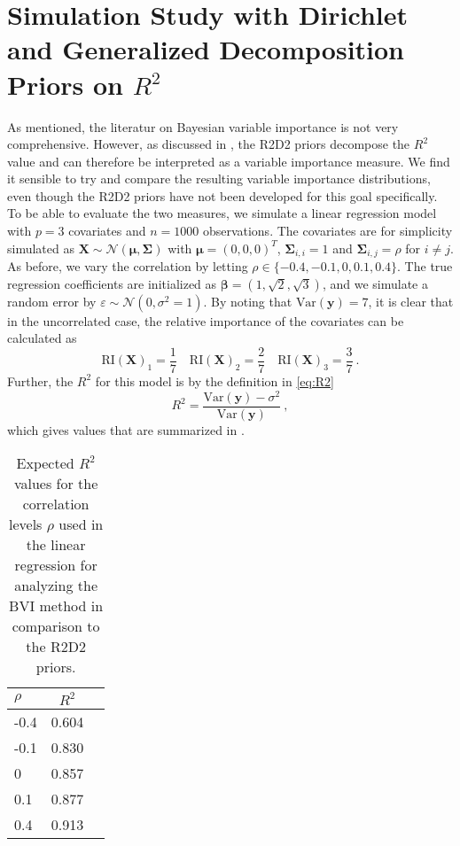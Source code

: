 \section{Simulation Study with Dirichlet and Generalized Decomposition Priors on \texorpdfstring{$R^2$}{Lg}}
\label{sec:r2d2method}
As mentioned, the literatur on Bayesian variable importance is not very comprehensive. However, as discussed in , the R2D2 priors decompose the $R^2$ value and can therefore be interpreted as a variable importance measure. We find it sensible to try and compare the resulting variable importance distributions, even though the R2D2 priors have not been developed for this goal specifically. To be able to evaluate the two measures, we simulate a linear regression model with $p=3$ covariates and $n=1000$ observations. The covariates are for simplicity simulated as $\mathbf{X} \sim \mathcal{N}(\boldsymbol{\mu}, \boldsymbol{\Sigma})$ with $\boldsymbol{\mu} = (0, 0, 0)^T$, $\boldsymbol{\Sigma}_{i, i} = 1$ and $\boldsymbol{\Sigma}_{i, j} = \rho$ for $i \neq j$. As before, we vary the correlation by letting $\rho \in \{-0.4, -0.1, 0, 0.1, 0.4\}$. The true regression coefficients are initialized as $\boldsymbol{\beta} = (1, \sqrt{2}, \sqrt{3})$, and we simulate a random error by $\varepsilon \sim \mathcal{N}(0, \sigma^2 = 1)$.  By noting that $\text{Var}(\mathbf{y}) = 7$, it is clear that in the uncorrelated case, the relative importance of the covariates can be calculated as
\begin{equation}
    \label{eq:RI_R2D2}
    \text{RI}(\mathbf{X})_{1} =  \frac{1}{7} \quad \text{RI}(\mathbf{X})_{2} =  \frac{2}{7} \quad  \text{RI}(\mathbf{X})_{3} =  \frac{3}{7} \ .
\end{equation}
Further, the $R^2$ for this model is by the definition in \eqref{eq:R2}
\begin{equation}
    R^2 = \frac{\text{Var}(\mathbf{y}) - \sigma^2}{\text{Var}(\mathbf{y})} \ ,
\end{equation}
which gives values that are summarized in .
\begin{table}[H]
    \centering
    \begin{tabular}{lcc}
    \toprule
    \textbf{\(\rho\)} & $R^2$  \\
    \midrule
    -0.4 & 0.604 \\
    -0.1 & 0.830 \\
    0    & 0.857 \\
    0.1  & 0.877 \\
    0.4  & 0.913 \\
    \bottomrule
    \end{tabular}
    \caption[Expected $R^2$ for comparison of BVI and shrinkage prior methods]{Expected $R^2$ values for the correlation levels $\rho$ used in the linear regression for analyzing the BVI method in comparison to the R2D2 priors.}
    \label{table:r2values_r2d2}
\end{table}
